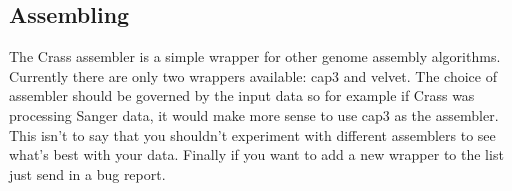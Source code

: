 \documentclass[11pt]{article} %
\begin{document}
\subsection{Assembling}
The Crass assembler is a simple wrapper for other genome assembly algorithms.  Currently there are only two wrappers available: cap3 and velvet.  The choice of assembler should be governed by the input data so for example if Crass was processing Sanger data, it would make more sense to use cap3 as the assembler.  This isn't to say that you shouldn't experiment with different assemblers to see what's best with your data.  Finally if you want to add a new wrapper to the list just send in a bug report.
\end{document}
